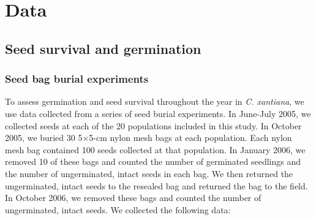 \documentclass[12pt, oneside, titlepage]{article}   	%
\begin{document}

\section{Data}

\subsection{Seed survival and germination}

\subsubsection{Seed bag burial experiments}

To assess germination and seed survival throughout the year in \textit{C. xantiana}, we use data collected from a series of seed burial experiments. In June-July 2005, we collected seeds at each of the 20 populations included in this study. In October 2005, we buried 30 5$\times$5-cm nylon mesh bags at each population. Each nylon mesh bag contained 100 seeds collected at that population. In January 2006, we removed 10 of these bags and counted the number of germinated seedlings and the number of ungerminated, intact seeds in each bag. We then returned the ungerminated, intact seeds to the resealed bag and returned the bag to the field. In October 2006, we removed these bags and counted the number of ungerminated, intact seeds. We collected the following data:
\end{document}
